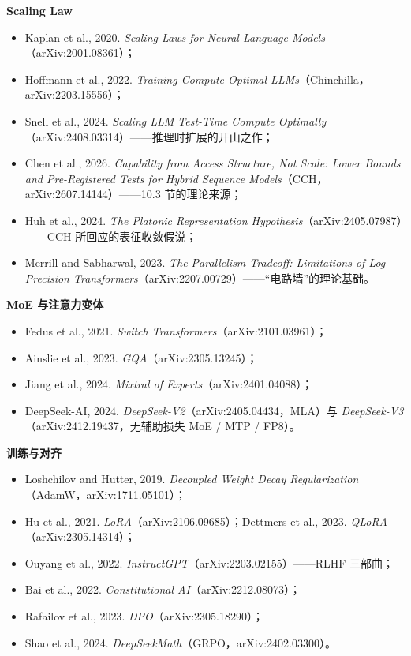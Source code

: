 \documentclass[12pt,a4paper]{article}
\begin{document}
\textbf{Scaling Law}
\begin{itemize}
  \item Kaplan et al., 2020. \emph{Scaling Laws for Neural Language Models}（arXiv:2001.08361）；
  \item Hoffmann et al., 2022. \emph{Training Compute-Optimal LLMs}（Chinchilla，arXiv:2203.15556）；
  \item Snell et al., 2024. \emph{Scaling LLM Test-Time Compute Optimally}（arXiv:2408.03314）——推理时扩展的开山之作；
  \item Chen et al., 2026. \emph{Capability from Access Structure, Not Scale: Lower Bounds and Pre-Registered Tests for Hybrid Sequence Models}（CCH，arXiv:2607.14144）——10.3 节的理论来源；
  \item Huh et al., 2024. \emph{The Platonic Representation Hypothesis}（arXiv:2405.07987）——CCH 所回应的表征收敛假说；
  \item Merrill and Sabharwal, 2023. \emph{The Parallelism Tradeoff: Limitations of Log-Precision Transformers}（arXiv:2207.00729）——“电路墙”的理论基础。
\end{itemize}

\textbf{MoE 与注意力变体}
\begin{itemize}
  \item Fedus et al., 2021. \emph{Switch Transformers}（arXiv:2101.03961）；
  \item Ainslie et al., 2023. \emph{GQA}（arXiv:2305.13245）；
  \item Jiang et al., 2024. \emph{Mixtral of Experts}（arXiv:2401.04088）；
  \item DeepSeek-AI, 2024. \emph{DeepSeek-V2}（arXiv:2405.04434，MLA）与 \emph{DeepSeek-V3}（arXiv:2412.19437，无辅助损失 MoE / MTP / FP8）。
\end{itemize}

\textbf{训练与对齐}
\begin{itemize}
  \item Loshchilov and Hutter, 2019. \emph{Decoupled Weight Decay Regularization}（AdamW，arXiv:1711.05101）；
  \item Hu et al., 2021. \emph{LoRA}（arXiv:2106.09685）；Dettmers et al., 2023. \emph{QLoRA}（arXiv:2305.14314）；
  \item Ouyang et al., 2022. \emph{InstructGPT}（arXiv:2203.02155）——RLHF 三部曲；
  \item Bai et al., 2022. \emph{Constitutional AI}（arXiv:2212.08073）；
  \item Rafailov et al., 2023. \emph{DPO}（arXiv:2305.18290）；
  \item Shao et al., 2024. \emph{DeepSeekMath}（GRPO，arXiv:2402.03300）。
\end{itemize}
\end{document}
